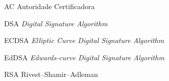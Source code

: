 \begin{siglas}
  \item[AC] Autoridade Certificadora
  \item[DSA] \textit{Digital Signature Algorithm}
  \item[ECDSA] \textit{Elliptic Curve Digital Signature Algorithm}
  \item[EdDSA] \textit{Edwards-curve Digital Signature Algorithm}
  \item[RSA] Rivest–Shamir–Adleman
  
\end{siglas}
